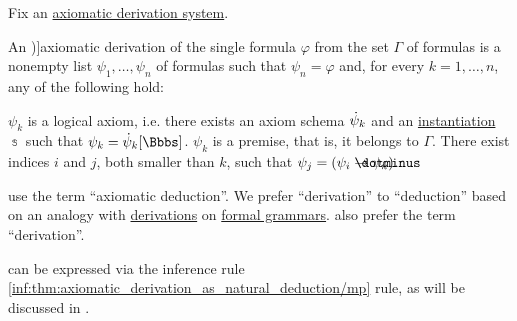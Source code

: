 \begin{definition}\label{def:axiomatic_derivation}
  Fix an \hyperref[def:axiomatic_derivation_system]{axiomatic derivation system}.

  An \term[ru=вывод (\cite[35]{Герасимов2011Вычислимость})]{axiomatic derivation} of the single formula \( \varphi \) from the set \( \Gamma \) of formulas is a nonempty list \( \psi_1, \ldots, \psi_n \) of formulas such that \( \psi_n = \varphi \) and, for every \( k = 1, \ldots, n \), any of the following hold:
  \begin{thmenum}
     \( \psi_k \) is a logical axiom, i.e. there exists an axiom schema \( \dot{\psi}_k \) and an \hyperref[def:propositional_schema_instantiation]{instantiation} \( \Bbbs \) such that \( \psi_k = \syn\psi_k[\Bbbs] \).
     \( \psi_k \) is a premise, that is, it belongs to \( \Gamma \).
     There exist indices \( i \) and \( j \), both smaller than \( k \), such that \( \psi_j = (\psi_i \synimplies \psi_k) \).
  \end{thmenum}
\end{definition}
\begin{comments}
  \item {} use the term \enquote{axiomatic deduction}. We prefer \enquote{derivation} to \enquote{deduction} based on an analogy with \hyperref[def:formal_grammar/derivation]{derivations} on \hyperref[def:formal_grammar]{formal grammars}.  also prefer the term \enquote{derivation}.
  \item {} can be expressed via the inference rule \ref{inf:thm:axiomatic_derivation_as_natural_deduction/mp} rule, as will be discussed in .
\end{comments}

